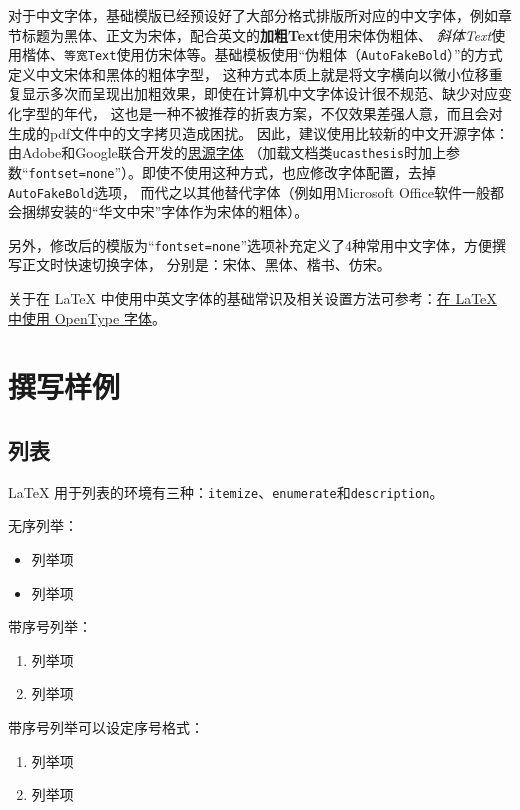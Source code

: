 对于中文字体，基础模版已经预设好了大部分格式排版所对应的中文字体，例如章节标题为黑体、正文为宋体，配合英文的\textbf{加粗Text}使用宋体伪粗体、
\textit{斜体Text}使用楷体、\texttt{等宽Text}使用仿宋体等。基础模板使用“伪粗体（\texttt{AutoFakeBold}）”的方式定义中文宋体和黑体的粗体字型，
这种方式本质上就是将文字横向以微小位移重复显示多次而呈现出加粗效果，即使在计算机中文字体设计很不规范、缺少对应变化字型的年代，
这也是一种不被推荐的折衷方案，不仅效果差强人意，而且会对生成的pdf文件中的文字拷贝造成困扰。
因此，建议使用比较新的中文开源字体：由Adobe和Google联合开发的\href{https://github.com/adobe-fonts}{思源字体}
（加载文档类\texttt{ucasthesis}时加上参数“\texttt{fontset=none}”）。即使不使用这种方式，也应修改字体配置，去掉\texttt{AutoFakeBold}选项，
而代之以其他替代字体（例如用Microsoft Office软件一般都会捆绑安装的“华文中宋”字体作为宋体的粗体）。

另外，修改后的模版为“\texttt{fontset=none}”选项补充定义了4种常用中文字体，方便撰写正文时快速切换字体，
分别是：{\songti 宋体}、{\heiti 黑体}、{\kaishu 楷书}、{\fangsong 仿宋}。

关于在 \LaTeX{} 中使用中英文字体的基础常识及相关设置方法可参考：\href{https://stone-zeng.github.io/2018-08-08-use-opentype-fonts/}{在 \LaTeX{} 中使用 OpenType 字体}。

\section{撰写样例}\label{sec:samples}

\subsection{列表}
\LaTeX{} 用于列表的环境有三种：\texttt{itemize}、\texttt{enumerate}和\texttt{description}。

无序列举：
\begin{itemize}
	\item 列举项
	\item 列举项
\end{itemize}

带序号列举：
\begin{enumerate}
	\item 列举项
	\item 列举项
\end{enumerate}

带序号列举可以设定序号格式：
\begin{enumerate}[1).]
	\item 列举项
	\item 列举项
\end{enumerate}

